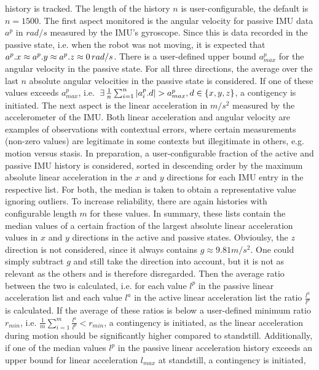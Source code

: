 \documentclass[english, master, utf8]{base/thesis_KBS}
\begin{document}
history is tracked. The length of the history $n$ is user-configurable, the default is $n = 1500$. The first aspect monitored is the angular velocity for passive IMU data $a^p$ in
$rad/s$ measured by the IMU's gyroscope.
Since this is data recorded in the passive state, i.e. when the robot was not moving, it is expected that $a^p.x \approx a^p.y \approx a^p.z \approx 0 \thinspace rad/s$.
There is a user-defined upper bound $a^p_{max}$ for the angular velocity in the passive state. For all three directions, the average over the last $n$ absolute angular velocities in
the passive state is considered. If one of these values exceeds $a^p_{max}$, i.e. $\thinspace \exists \thinspace \frac{1}{n}\sum_{i=1}^{n} |a^p_i.d| > a^p_{max}, d \in \{x, y, z\}$, a contigency is initiated.
The next aspect is the linear acceleration in $m/s^2$ measured by the accelerometer of the IMU.
Both linear acceleration and angular velocity are examples of observations with contextual errors, where certain measurements (non-zero values) are legitimate in some
contexts but illegitimate in others, e.g. motion versus stasis. \cite{Khalastchi:2018} In preparation, a user-configurable fraction of the active and passive IMU
history is considered, sorted in descending order by the maximum absolute linear acceleration in the $x$ and $y$ directions for each IMU entry in the respective list.
For both, the median is taken to obtain a representative value ignoring outliers. To increase reliability, there are again histories with configurable length $m$ for these values.
In summary, these lists contain the median values of a certain fraction of the largest absolute linear acceleration values in $x$ and $y$ directions in the active and passive states.
Obvioulsy, the $z$ direction is not considered, since it always contains $g \approx 9.81m/s^2$. One could simply subtract $g$ and still take the direction into account, but it is not
as relevant as the others and is therefore disregarded. Then the average ratio between the two is calculated, i.e. for each value $l^p$ in the passive linear acceleration list and
each value $l^a$ in the active linear acceleration list the ratio $\frac{l^a}{l^p}$ is calculated. If the average of these ratios is below a user-defined minimum ratio $r_{min}$,
i.e. $\frac{1}{m} \sum_{i=1}^{m} \frac{l^a}{l^p} < r_{min}$, a contingency is initiated, as the linear acceleration during motion should be significantly higher compared to standstill.
Additionally, if one of the median values $l^p$ in the passive linear acceleration history exceeds an upper bound for linear acceleration $l_{max}$ at standstill, a contingency is initiated,
\end{document}
